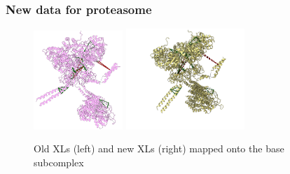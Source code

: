 \documentclass[a4paper,8pt]{beamer}
\begin{document}
  \begin{frame}
\frametitle{New data for proteasome}
\begin{figure}
  \centering
  \includegraphics[width=0.3\textwidth]{test-figures/exp-triples.png}
  \includegraphics[width=0.4\textwidth]{test-figures/new-base-data.png}
  \caption{Old XLs (left) and new XLs (right) mapped onto the base subcomplex}
\end{figure}

  \end{frame}
\end{document}

